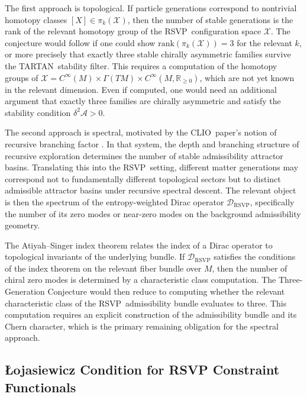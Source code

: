 \documentclass[12pt,a4paper]{article}
\newcommand{\RSVP}{\textrm{RSVP}}
\newcommand{\CLIO}{\textrm{CLIO}}
\newcommand{\TARTAN}{\textrm{TARTAN}}
\newcommand{\Field}{\mathcal{X}}
\begin{document}
The first approach is topological. If particle generations correspond to
nontrivial homotopy classes $[X]\in\pi_k(\Field)$, then the number of stable
generations is the rank of the relevant homotopy group of the \RSVP\
configuration space $\Field$. The conjecture would follow if one could show
$\mathrm{rank}(\pi_k(\Field))=3$ for the relevant $k$, or more precisely that
exactly three stable chirally asymmetric families survive the \TARTAN\ stability
filter. This requires a computation of the homotopy groups of $\Field=C^\infty(M)
\times\Gamma(TM)\times C^\infty(M,\mathbb{R}_{\geq 0})$, which are not yet known
in the relevant dimension. Even if computed, one would need an additional
argument that exactly three families are chirally asymmetric and satisfy the
stability condition $\delta^2\mathcal{A}>0$.

The second approach is spectral, motivated by the \CLIO\ paper's notion of
recursive branching factor \cite{Cheng2025}. In that system, the depth and
branching structure of recursive exploration determines the number of stable
admissibility attractor basins. Translating this into the \RSVP\ setting, different
matter generations may correspond not to fundamentally different topological
sectors but to distinct admissible attractor basins under recursive spectral
descent. The relevant object is then the spectrum of the entropy-weighted
Dirac operator $\mathcal{D}_\RSVP$, specifically the number of its zero modes
or near-zero modes on the background admissibility geometry.

The Atiyah--Singer index theorem \cite{AtiyahSinger1963} relates the index of
a Dirac operator to topological invariants of the underlying bundle. If
$\mathcal{D}_\RSVP$ satisfies the conditions of the index theorem on the
relevant fiber bundle over $M$, then the number of chiral zero modes is
determined by a characteristic class computation. The Three-Generation
Conjecture would then reduce to computing whether the relevant characteristic
class of the \RSVP\ admissibility bundle evaluates to three. This computation
requires an explicit construction of the admissibility bundle and its Chern
character, which is the primary remaining obligation for the spectral approach.

\subsection{Łojasiewicz Condition for RSVP Constraint Functionals}
\end{document}
